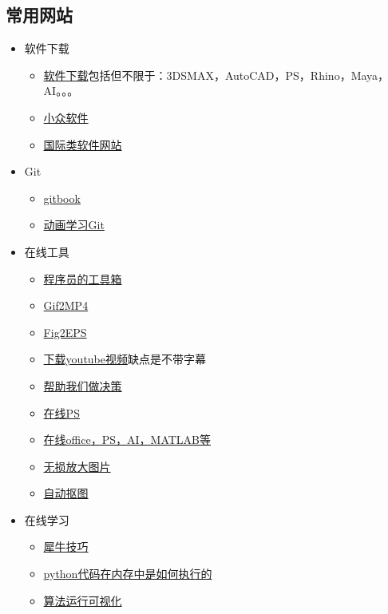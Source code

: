 \documentclass[UTF8,oneside]{ctexbook}
\begin{document}
\subsection{常用网站}
\begin{itemize}
	\item 软件下载
	      \begin{itemize}
		      \item \href{https://www.3d66.com/popsoft_26.html}{软件下载}\quad 包括但不限于：3DSMAX，AutoCAD，PS，Rhino，Maya，AI。。。
		      \item \href{https://www.appinn.com/category/windows/}{小众软件}
		      \item \href{https://filehippo.com/zh/}{国际类软件网站}
	      \end{itemize}
	\item Git
	      \begin{itemize}
		      \item \href{http://gitbook.liuhui998.com/index.html}{gitbook}
		      \item \href{https://learngitbranching.js.org/?demo}{动画学习Git}
	      \end{itemize}
	\item 在线工具
	      \begin{itemize}
		      \item \href{https://tool.lu}{程序员的工具箱}
		      \item \href{https://cloudconvert.com/gif-to-mp4}{Gif2MP4}
		      \item \href{https://cn.office-converter.com/FIG-to-EPS}{Fig2EPS}
		      \item \href{http://www.ytube.win}{下载youtube视频}\quad 缺点是不带字幕
		      \item \href{https://www.slant.co}{帮助我们做决策}
		      \item \href{https://www.photopea.com}{在线PS}
		      \item \href{https://uzer.me/u/signin}{在线office，PS，AI，MATLAB等}
		      \item \href{https://bigjpg.com}{无损放大图片}
		      \item \href{https://www.remove.bg}{自动抠图}
	      \end{itemize}
	\item 在线学习
	      \begin{itemize}
		      \item \href{http://www.xuexiniu.com/forum.php?mod=forumdisplay&fid=102&filter=typeid&typeid=1}{犀牛技巧}
		      \item \href{http://www.pythontutor.com}{python代码在内存中是如何执行的}
		      \item \href{https://algorithm-visualizer.org}{算法运行可视化}
	      \end{itemize}
\end{itemize}
\end{document}
